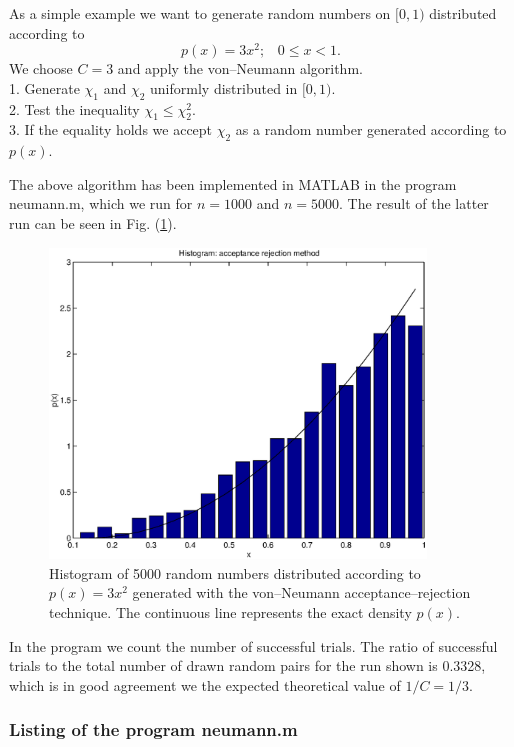 As a simple example we want to generate random numbers on $[0,1)$    
distributed according to
\begin{equation*}
p(x) = 3x^2; \;\;\; 0 \le x <1.
\end{equation*}
We choose $C=3$ and apply the von--Neumann algorithm. \\
1. Generate $\chi_1$ and $\chi_2$ uniformly distributed in 
    $[0,1)$. \\
2. Test the inequality $\chi_1 \le \chi_2^2.$     \\
3. If the equality holds we accept $\chi_2$ as a random number 
generated according to $p(x)$.

The above algorithm has been implemented in MATLAB in the program
{\sf neumann.m}, which we run for $n=1000$ and $n=5000$. The 
result of the latter run can be seen in Fig. (\ref{F_NEUMANN}).
\begin{figure}
\label{F_NEUMANN}
\includegraphics[width=10cm]{./Figures/f_neumann.eps}
\caption{Histogram of 5000 random numbers distributed
according to $p(x) = 3x^2$ generated with the von--Neumann
acceptance--rejection technique.
The continuous line represents the exact density $p(x)$.}
\end{figure}
In the program we count the number of successful trials. The ratio
of successful trials to the total number of drawn random pairs for 
the run shown
is 0.3328, which is in good agreement we the expected theoretical
value of $1/C=1/3$.

\subsubsection{Listing of the program neumann.m}




